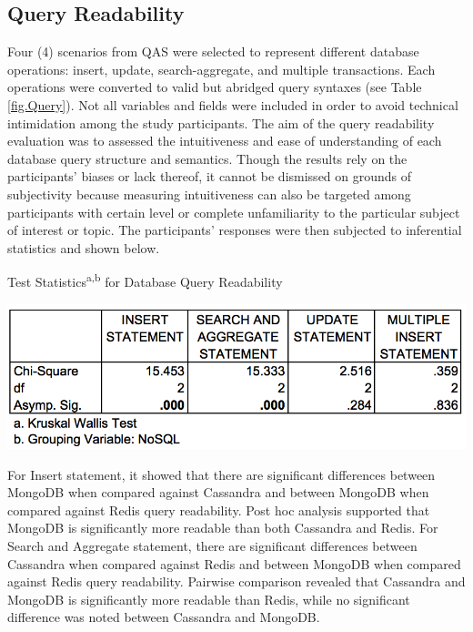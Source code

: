 \documentclass[5p]{elsarticle}
\begin{document}
\subsection{Query Readability}
Four (4) scenarios from QAS were selected to represent different database operations: insert, update, search-aggregate, and multiple transactions. 
Each operations were converted to valid but abridged query syntaxes (see Table \ref{fig.Query}). 
Not all variables and fields were included in order to avoid technical intimidation among the study participants. 
The aim of the query readability evaluation was to assessed the intuitiveness and ease of understanding of each database query structure and semantics. 
Though the results rely on the participants’ biases or lack thereof, it cannot be dismissed on grounds of subjectivity because measuring intuitiveness 
can also be targeted among participants with certain level or complete unfamiliarity to the particular subject of interest or topic. 
The participants’ responses were then subjected to inferential statistics and shown below.

\begin{table}[!hb]
    \centering
    \caption{Test Statistics\textsuperscript{a,b} for Database Query Readability }
    \includegraphics[scale=0.28] {Readability}
    \label{fig.readability}
\end{table}

For Insert statement, it showed that there are significant differences between MongoDB when compared against Cassandra and between MongoDB when compared against Redis query readability.
Post hoc analysis supported that MongoDB is significantly more readable than both Cassandra and Redis.
For Search and Aggregate statement, there are significant differences between Cassandra when compared against Redis and between MongoDB when compared against Redis query readability. 
Pairwise comparison revealed that Cassandra and MongoDB is significantly more readable than Redis, while no significant difference was noted between Cassandra and MongoDB.\newline
\end{document}
